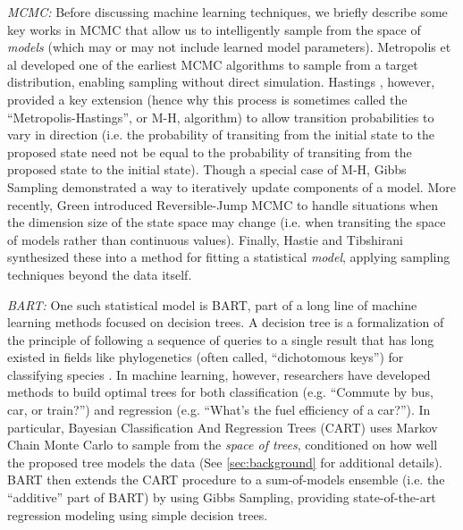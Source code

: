 \documentclass[12pt]{article}
\begin{document}
\emph{MCMC:} Before discussing machine learning techniques, we briefly describe some key works in MCMC that allow us to intelligently sample from the space of \emph{models} (which may or may not include learned model parameters).  Metropolis et al \cite{metropolis1953equation} developed one of the earliest MCMC algorithms to sample from a target distribution, enabling sampling without direct simulation.  Hastings \cite{hastings1970monte}, however, provided a key extension (hence why this process is sometimes called the ``Metropolis-Hastings'', or M-H, algorithm) to allow transition probabilities to vary in direction (i.e. the probability of transiting from the initial state to the proposed state need not be equal to the probability of transiting from the proposed state to the initial state).  Though a special case of M-H, Gibbs Sampling \cite{geman1984stochastic} demonstrated a way to iteratively update components of a model.  More recently, Green \cite{green1995reversible} introduced Reversible-Jump MCMC to handle situations when the dimension size of the state space may change (i.e. when transiting the space of models rather than continuous values).  Finally, Hastie and Tibshirani \cite{hastie2000bayesian} synthesized these into a method for fitting a statistical \emph{model}, applying sampling techniques beyond the data itself.

\emph{BART:} One such statistical model is BART, part of a long line of machine learning methods focused on decision trees.   A decision tree is a formalization of the principle of following a sequence of queries to a single result that has long existed in fields like phylogenetics (often called, ``dichotomous keys'') for classifying species \cite{pankhurst1991practical}.  In machine learning, however, researchers have developed methods to build optimal trees for both classification (e.g. ``Commute by bus, car, or train?'') and regression \cite{breiman1984classification} (e.g. ``What's the fuel efficiency of a car?'').  In particular, Bayesian Classification And Regression Trees (CART) \cite{chipman1998bayesian} uses Markov Chain Monte Carlo to sample from the \emph{space of trees}, conditioned on how well the proposed tree models the data (See \autoref{sec:background} for additional details).  BART \cite{chipman2010bart} then extends the CART procedure to a sum-of-models ensemble (i.e. the ``additive'' part of BART) by using Gibbs Sampling, providing state-of-the-art regression modeling using simple decision trees. 
\end{document}

